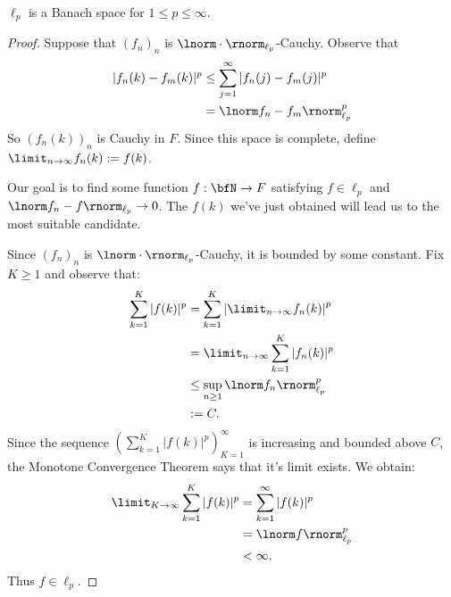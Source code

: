     \begin{proposition}
        $\ell_p$ is a Banach space for $1 \leq p \leq \infty$.
    \end{proposition}
        \begin{proof}
            Suppose that $(f_n)_n$ is $\lnorm \cdot \rnorm_{\ell_p}$-Cauchy. Observe that
                \begin{equation*}
                \begin{split}
                    |f_n(k) - f_m(k)|^p
                    & \leq \sum_{j = 1}^\infty |f_n(j) - f_m(j)|^p \\
                    & = \lnorm f_n - f_m \rnorm_{\ell_p}^p
                \end{split}
                \end{equation*}
            So $(f_n(k))_n$ is Cauchy in $F$. Since this space is complete, define $\limit_{n \rightarrow \infty}f_n(k) := f(k)$.

            Our goal is to find some function $f:\bfN \rightarrow F$ satisfying $f \in \ell_p$ and $\lnorm f_n -f \rnorm_{\ell_p} \rightarrow 0$. The $f(k)$ we've just obtained will lead us to the most suitable candidate.

            Since $(f_n)_n$ is $\lnorm \cdot \rnorm_{\ell_p}$-Cauchy, it is bounded by some constant. Fix $K \geq 1$ and observe that:
                \begin{equation*}
                \begin{split}
                    \sum_{k = 1}^K |f(k)|^p 
                    & = \sum_{k = 1}^K\left|\limit_{n \rightarrow \infty}f_n(k)\right|^p \\
                    & = \limit_{n \rightarrow \infty}\sum_{k = 1}^K |f_n(k)|^p \\
                    & \leq \sup_{n \geq 1}\lnorm f_n \rnorm_{\ell_p}^p \\
                    & := C.
                \end{split}
                \end{equation*}
            Since the sequence $\left( \sum_{k = 1}^K |f(k)|^p \right)_{K = 1}^\infty$ is increasing and bounded above $C$, the Monotone Convergence Theorem says that it's limit exists. We obtain:
                \begin{equation*}
                \begin{split}
                    \limit_{K \rightarrow \infty}\sum_{k = 1}^K |f(k)|^p 
                    & = \sum_{k = 1}^\infty |f(k)|^p \\
                    & = \lnorm f \rnorm_{\ell_p}^p \\
                    & < \infty.
                \end{split}
                \end{equation*}
            Thus $f \in \ell_p$.


\end{proof}
